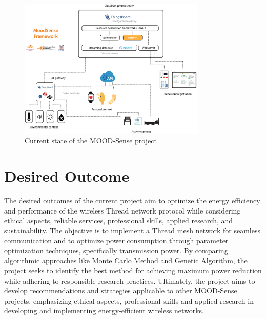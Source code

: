\begin{figure}[!htb]
    \centering
    \includegraphics[width=0.8\textwidth]{images/rationale/rationale_present_situation.png}
    \caption{Current state of the MOOD-Sense project}
    \label{fig:rationale_present_situation}
\end{figure}


\section{Desired Outcome}
The desired outcomes of the current project aim to optimize the energy efficiency and performance of the wireless Thread network protocol while considering ethical aspects, reliable services, professional skills, applied research, and sustainability. The objective is to implement a Thread mesh network for seamless communication and to optimize power consumption through parameter optimization techniques, specifically transmission power. By comparing algorithmic approaches like Monte Carlo Method and Genetic Algorithm, the project seeks to identify the best method for achieving maximum power reduction while adhering to responsible research practices. Ultimately, the project aims to develop recommendations and strategies applicable to other MOOD-Sense projects, emphasizing ethical aspects, professional skills and applied research in developing and implementing energy-efficient wireless networks.
